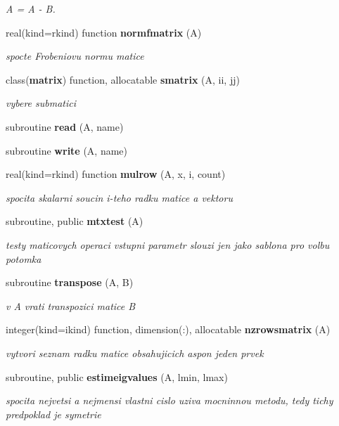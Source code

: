 \begin{DoxyCompactItemize}
\begin{DoxyCompactList}\small\item\em A = A -\/ B. \end{DoxyCompactList}\item 
real(kind=rkind) function {\bf normfmatrix} (A)
\begin{DoxyCompactList}\small\item\em spocte Frobeniovu normu matice \end{DoxyCompactList}\item 
class({\bf matrix}) function, allocatable {\bf smatrix} (A, ii, jj)
\begin{DoxyCompactList}\small\item\em vybere submatici \end{DoxyCompactList}\item 
subroutine {\bf read} (A, name)
\item 
subroutine {\bf write} (A, name)
\item 
real(kind=rkind) function {\bf mulrow} (A, x, i, count)
\begin{DoxyCompactList}\small\item\em spocita skalarni soucin i-\/teho radku matice a vektoru \end{DoxyCompactList}\item 
subroutine, public {\bf mtxtest} (A)
\begin{DoxyCompactList}\small\item\em testy maticovych operaci vstupni parametr slouzi jen jako sablona pro volbu potomka \end{DoxyCompactList}\item 
subroutine {\bf transpose} (A, B)
\begin{DoxyCompactList}\small\item\em v A vrati transpozici matice B \end{DoxyCompactList}\item 
integer(kind=ikind) function, dimension(\+:), allocatable {\bf nzrowsmatrix} (A)
\begin{DoxyCompactList}\small\item\em vytvori seznam radku matice obsahujicich aspon jeden prvek \end{DoxyCompactList}\item 
subroutine, public {\bf estimeigvalues} (A, lmin, lmax)
\begin{DoxyCompactList}\small\item\em spocita nejvetsi a nejmensi vlastni cislo uziva mocninnou metodu, tedy tichy predpoklad je symetrie \end{DoxyCompactList}\end{DoxyCompactItemize}


